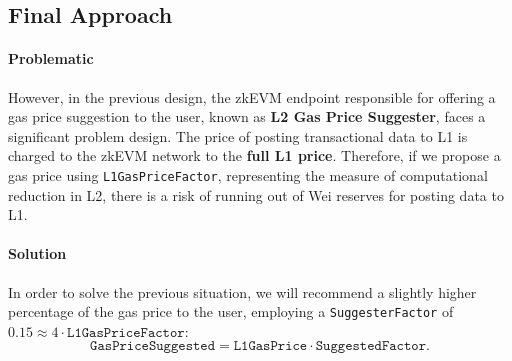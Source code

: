 %
%
%


\subsection{Final Approach}

\paragraph*{Problematic}

However, in the previous design, the zkEVM endpoint responsible for offering a gas price suggestion to the user, known as \textbf{L2 Gas Price Suggester}, faces a significant problem design. The price of posting transactional data to L1 is charged to the zkEVM network to the \textbf{full L1 price}. Therefore, if we propose a gas price using \texttt{L1GasPriceFactor}, representing the measure of computational reduction in L2, there is a risk of running out of Wei reserves for posting data to L1.

\paragraph*{Solution}

In order to solve the previous situation, we will recommend a slightly higher percentage of the gas price to the user, employing a \texttt{SuggesterFactor} of $0.15 \approx 4 \cdot \texttt{L1GasPriceFactor}$:
\[
\texttt{GasPriceSuggested} = \texttt{L1GasPrice} \cdot \texttt{SuggestedFactor}.
\]


